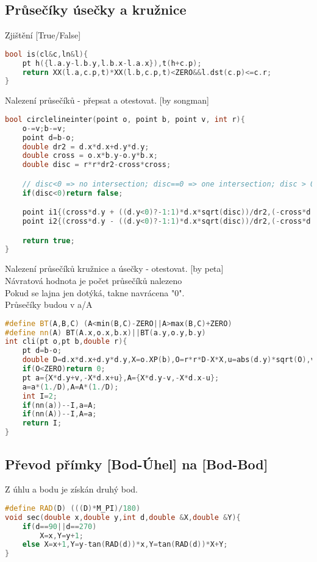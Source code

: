 \documentclass[11pt]{article}
\begin{document}
\subsection{Průsečíky úsečky a kružnice}
Zjištění [True/False]
\begin{lstlisting}[language=C++]
bool is(cl&c,ln&l){
    pt h({l.a.y-l.b.y,l.b.x-l.a.x}),t(h+c.p);
    return XX(l.a,c.p,t)*XX(l.b,c.p,t)<ZERO&&l.dst(c.p)<=c.r;
}
\end{lstlisting}
Nalezení průsečíků - přepsat a otestovat. [by songman]
\begin{lstlisting}[language=C++]
bool circlelineinter(point o, point b, point v, int r){
    o-=v;b-=v;
    point d=b-o;
    double dr2 = d.x*d.x+d.y*d.y;
    double cross = o.x*b.y-o.y*b.x;
    double disc = r*r*dr2-cross*cross;

    // disc<0 => no intersection; disc==0 => one intersection; disc > 0 => two intersections
    if(disc<0)return false;

    point i1{(cross*d.y + ((d.y<0)?-1:1)*d.x*sqrt(disc))/dr2,(-cross*d.x + abs(d.y)*sqrt(disc))/dr2};
    point i2{(cross*d.y - ((d.y<0)?-1:1)*d.x*sqrt(disc))/dr2,(-cross*d.x - abs(d.y)*sqrt(disc))/dr2};

    return true;
}
\end{lstlisting}
Nalezení průsečíků kružnice a úsečky - otestovat. [by peta]
\\Návratová hodnota je počet průsečíků nalezeno
\\Pokud se lajna jen dotýká, takne navrácena "0".
\\Průsečíky budou v \textsf{a}/\textsf{A}
\begin{lstlisting}[language=C++]
#define BT(A,B,C) (A<min(B,C)-ZERO||A>max(B,C)+ZERO)
#define nn(A) BT(A.x,o.x,b.x)||BT(a.y,o.y,b.y)
int cli(pt o,pt b,double r){
    pt d=b-o;
    double D=d.x*d.x+d.y*d.y,X=o.XP(b),O=r*r*D-X*X,u=abs(d.y)*sqrt(O),v=d.y/abs(d.y)*d.x*sqrt(O);
    if(O<ZERO)return 0;
    pt a={X*d.y+v,-X*d.x+u},A={X*d.y-v,-X*d.x-u};
    a=a*(1./D),A=A*(1./D);
    int I=2;
    if(nn(a))--I,a=A;
    if(nn(A))--I,A=a;
    return I;
}
\end{lstlisting}
\subsection{Převod přímky [Bod-Úhel] na [Bod-Bod]}
Z úhlu a bodu je získán druhý bod.
\begin{lstlisting}[language=C++]
#define RAD(D) (((D)*M_PI)/180)
void sec(double x,double y,int d,double &X,double &Y){
    if(d==90||d==270)
        X=x,Y=y+1;
    else X=x+1,Y=y-tan(RAD(d))*x,Y=tan(RAD(d))*X+Y;
}
\end{lstlisting}
\end{document}
